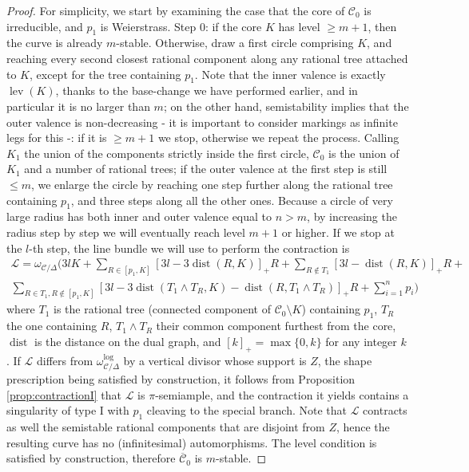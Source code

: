 \documentclass[11pt]{amsart}
\newcommand{\dvr}{\Delta}
\newcommand{\dist}{\operatorname{dist}}
\newcommand{\lev}{\operatorname{lev}}
\theoremstyle{plain}
\theoremstyle{definition}
\begin{document}
\begin{proof}
  For simplicity, we start by examining the case that the core of $\mathcal C_0$ is irreducible, and $p_1$ is Weierstrass. Step $0$: if the core $K$ has level $\geq m+1$, then the curve is already $m$-stable. Otherwise, draw a first circle comprising $K$, and reaching every second closest rational component along any rational tree attached to $K$, except for the tree containing $p_1$. Note that the inner valence is exactly $\lev(K)$, thanks to the base-change we have performed earlier, and in particular it is no larger than $m$; on the other hand, semistability implies that the outer valence is non-decreasing - it is important to consider markings as infinite legs for this -: if it is $\geq m+1$ we stop, otherwise we repeat the process. Calling $K_1$ the union of the components strictly inside the first circle, $\mathcal C_0$ is the union of $K_1$ and a number of rational trees; if the outer valence at the first step is still $\leq m$, we enlarge the circle by reaching one step further along the rational tree containing $p_1$, and three steps along all the other ones. Because a circle of very large radius has both inner and outer valence equal to $n>m$, by increasing the radius step by step we will eventually reach level $m+1$ or higher. If we stop at the $l$-th step, the line bundle we will use to perform the contraction is
  \begin{multline*}
  \mathcal L=\omega_{\mathcal C/\dvr}(3l K + \sum_{R\in [p_1,K]}[3l-3\dist(R,K)]_+R +\sum_{R\notin T_1}[3l-\dist(R,K)]_+R +\\
  \sum_{R\in T_1,R\notin [p_1,K]}[3l-3\dist(T_1\wedge T_R,K)-\dist(R,T_1\wedge T_R)]_+R+ \sum_{i=1}^np_i)
  \end{multline*}
  where $T_1$ is the rational tree (connected component of $\mathcal C_0\setminus K$) containing $p_1$, $T_R$ the one containing $R$, $T_1\wedge T_R$ their common component furthest from the core, $\dist$ is the distance on the dual graph, and $[k]_+=\max\{0,k\}$ for any integer $k$. If $\mathcal L$ differs from $\omega_{\mathcal C/\dvr}^{\text{log}}$ by a vertical divisor whose support is $Z$, the shape prescription being satisfied by construction, it follows from Proposition \ref{prop:contractionI} that $\mathcal L$ is $\pi$-semiample, and the contraction it yields contains a singularity of type I with $p_1$ cleaving to the special branch. Note that $\mathcal L$ contracts as well the semistable rational components that are disjoint from $Z$, hence the resulting curve has no (infinitesimal) automorphisms. The level condition is satisfied by construction, therefore $\overline{\mathcal C}_0$ is $m$-stable.
  

\end{proof}
\end{document}
